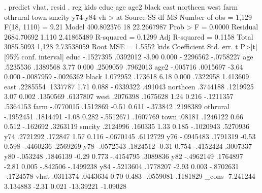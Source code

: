 . predict vhat, resid
{\smallskip}
. reg kids educ age age2 black east northcen west farm othrural town smcity y74-y84 vh
> at
{\smallskip}
      Source {\VBAR}       SS           df       MS      Number of obs   =     1,129
   F(18, 1110)     =      9.21
       Model {\VBAR}  400.802376        18  22.2667987   Prob > F        =    0.0000
    Residual {\VBAR}  2684.70692     1,110  2.41865489   R-squared       =    0.1299
   Adj R-squared   =    0.1158
       Total {\VBAR}   3085.5093     1,128  2.73538059   Root MSE        =    1.5552
{\smallskip}
        kids {\VBAR} Coefficient  Std. err.      t    P>|t|     [95\% conf. interval]
        educ {\VBAR}  -.1527395   .0392012    -3.90   0.000    -.2296562   -.0758227
         age {\VBAR}   .5235536   .1389568     3.77   0.000     .2509059    .7962013
        age2 {\VBAR}   -.005716   .0015697    -3.64   0.000    -.0087959   -.0026362
       black {\VBAR}   1.072952    .173618     6.18   0.000     .7322958    1.413609
        east {\VBAR}   .2285554   .1337787     1.71   0.088    -.0339322     .491043
    northcen {\VBAR}   .3744188   .1219925     3.07   0.002     .1350569    .6137807
        west {\VBAR}   .2076398   .1675628     1.24   0.216    -.1211357    .5364153
        farm {\VBAR}  -.0770015   .1512869    -0.51   0.611     -.373842    .2198389
    othrural {\VBAR}  -.1952451   .1814491    -1.08   0.282    -.5512671    .1607769
        town {\VBAR}     .08181   .1246122     0.66   0.512     -.162692    .3263119
      smcity {\VBAR}   .2124996    .160335     1.33   0.185    -.1020943    .5270936
         y74 {\VBAR}   .2721292    .172847     1.57   0.116    -.0670145    .6112729
         y76 {\VBAR}  -.0945483   .1791319    -0.53   0.598    -.4460236    .2569269
         y78 {\VBAR}  -.0572543   .1824512    -0.31   0.754    -.4152424    .3007337
         y80 {\VBAR}   -.053248   .1846139    -0.29   0.773    -.4154795    .3089836
         y82 {\VBAR}  -.4962149   .1764897    -2.81   0.005     -.842506   -.1499238
         y84 {\VBAR}  -.5213604   .1778207    -2.93   0.003    -.8702631   -.1724578
        vhat {\VBAR}   .0311374   .0443634     0.70   0.483    -.0559081    .1181829
       _cons {\VBAR}  -7.241244   3.134883    -2.31   0.021    -13.39221    -1.09028
{\smallskip}
